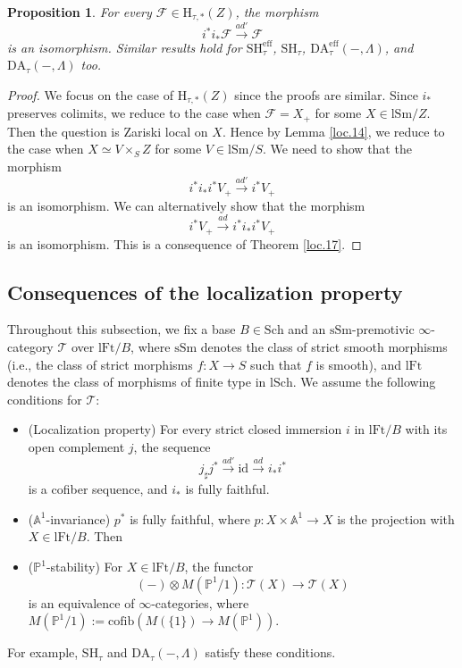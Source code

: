 \documentclass[10pt]{amsart}
\newtheorem{prop}[thm]{Proposition}
\theoremstyle{definition}
\theoremstyle{remark}
\numberwithin{equation}{subsection}
\newcommand{\A}{\mathbb{A}}
\renewcommand{\P}{\mathbb{P}}
\newcommand{\cF}{\mathcal{F}}
\newcommand{\rH}{\mathrm{H}}
\newcommand{\sT}{\mathscr{T}}
\newcommand{\id}{\mathrm{id}}
\newcommand{\ul}{\underline}
\newcommand{\eff}{{\mathrm{eff}}}
\newcommand{\SH}{\mathrm{SH}}
\newcommand{\DA}{\mathrm{DA}}
\newcommand{\cofib}{\mathrm{cofib}}
\newcommand{\Sch}{\mathrm{Sch}}
\newcommand{\lSch}{\mathrm{lSch}}
\newcommand{\lSm}{\mathrm{lSm}}
\newcommand{\lFt}{\mathrm{lFt}}
\newcommand{\sSm}{\mathrm{sSm}}
\begin{document}
\begin{prop}
For every $\cF\in \rH_{\tau,*}(Z)$, the morphism
\[
i^*i_*\cF \xrightarrow{ad'} \cF
\]
is an isomorphism.
Similar results hold for $\SH_{\tau}^\eff$, $\SH_{\tau}$, $\DA_{\tau}^\eff(-,\Lambda)$, and $\DA_{\tau}(-,\Lambda)$ too.
\end{prop}
\begin{proof}
We focus on the case of $\rH_{\tau,*}(Z)$ since the proofs are similar.
Since $i_*$ preserves colimits,
we reduce to the case when $\cF=X_+$ for some $X\in \lSm/Z$.
Then the question is Zariski local on $X$.
Hence by Lemma \ref{loc.14}, we reduce to the case when $X\simeq V\times_S Z$ for some $V\in \lSm/S$.
We need to show that the morphism
\[
i^*i_*i^*V_+\xrightarrow{ad'} i^*V_+
\]
is an isomorphism.
We can alternatively show that the morphism
\[
i^*V_+\xrightarrow{ad} i^*i_*i^*V_+
\]
is an isomorphism.
This is a consequence of Theorem \ref{loc.17}.
\end{proof}

\subsection{Consequences of the localization property}
\label{consequences}


Throughout this subsection, we fix a base $B\in \Sch$ and an $\sSm$-premotivic $\infty$-category $\sT$ over $\lFt/B$, where $\sSm$ denotes the class of strict smooth morphisms (i.e., the class of strict morphisms $f\colon X\to S$ such that $\ul{f}$ is smooth), and $\lFt$ denotes the class of morphisms of finite type in $\lSch$.
We assume the following conditions for $\sT$:
\begin{itemize}
\item (Localization property) For every strict closed immersion $i$ in $\lFt/B$ with its open complement $j$, the sequence
\[
j_\sharp j^*\xrightarrow{ad'} \id \xrightarrow{ad} i_*i^*
\]
is a cofiber sequence, and $i_*$ is fully faithful.
\item ($\A^1$-invariance) $p^*$ is fully faithful, where $p\colon X\times \A^1\to X$ is the projection with $X\in \lFt/B$.
Then 
\item ($\P^1$-stability) For $X\in \lFt/B$,
the functor
\[
(-)\otimes M(\P^1/1) \colon \sT(X)\to \sT(X)
\]
is an equivalence of $\infty$-categories, where $M(\P^1/1):=\cofib(M(\{1\})\to M(\P^1))$.
\end{itemize}
For example, $\SH_{\tau}$ and $\DA_{\tau}(-,\Lambda)$ satisfy these conditions.
\end{document}

